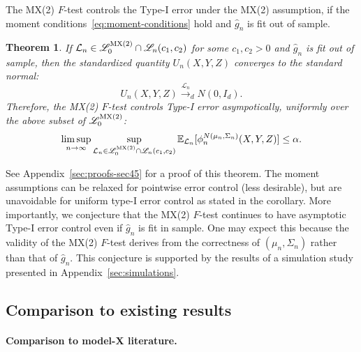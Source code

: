 \documentclass[12pt]{article}
\newtheorem{theorem}{Theorem}
\theoremstyle{definition}
\theoremstyle{remark}
\newcommand{\srx}{X}
\newcommand{\srz}{Z}
\newcommand{\sry}{Y}
\begin{document}
The MX(2) $F$-test controls the Type-I error under the MX(2) assumption, if the moment conditions~\eqref{eq:moment-conditions} hold and $\widehat g_n$ is fit out of sample.
\begin{theorem} \label{thm:asymptotic-alpha-level}
If $\mathcal L_n \in \mathscr L_0^{\textnormal{MX(2)}}\cap \mathscr L_n(c_1, c_2)$ for some $c_1, c_2 > 0$ and $\widehat g_n$ is fit out of sample, then the standardized quantity $U_n(\srx, \sry, \srz)$ converges to the standard normal: 
\begin{equation}
	U_n(\srx, \sry, \srz) \overset{\mathcal L_n}\rightarrow_d N(0, I_d).
	\label{eq:asymptotic-normality}
\end{equation}
Therefore, the MX(2) $F$-test controls Type-I error asympotically, uniformly over the above subset of $\mathscr L_0^{\textnormal{MX(2)}}$: 
\begin{equation}
	\limsup_{n \rightarrow \infty} \sup_{\mathcal L_n \in \mathscr L_0^{\textnormal{MX(2)}}\cap \mathscr L_n(c_1, c_2)} \mathbb E_{\mathcal L_n}[\phi^{N(\mu_n, \Sigma_n)}_n(\srx, \sry, \srz)] \leq \alpha.
	\label{asymptotic-alpha-level}
\end{equation}
\end{theorem}

See Appendix~\ref{sec:proofs-sec45} for a proof of this theorem. The moment assumptions can be relaxed for pointwise error control (less desirable), but are unavoidable for uniform type-I error control as stated in the corollary. More importantly, we conjecture that the MX(2) $F$-test continues to have asymptotic Type-I error control even if $\widehat g_n$ is fit in sample. One may expect this because the validity of the MX(2) $F$-test derives from the correctness of $(\mu_n, \Sigma_n)$ rather than that of $\widehat g_n$. This conjecture is supported by the results of a simulation study presented in Appendix~\ref{sec:simulations}.

\subsection{Comparison to existing results} \label{sec:comparison-to-existing-results-3}

\paragraph{Comparison to model-X literature.}
\end{document}
